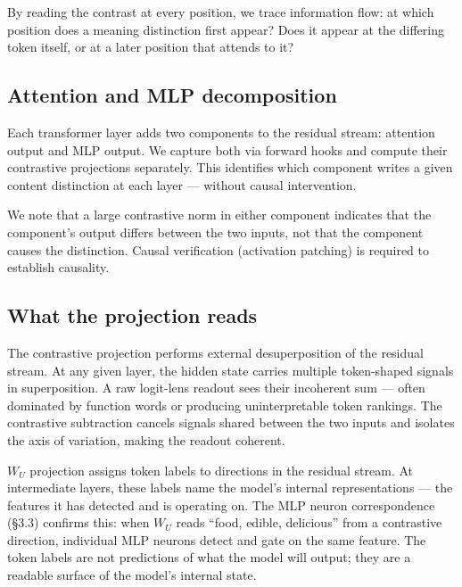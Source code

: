 \documentclass[11pt]{article}
\newcommand{\WU}{W_U}
\begin{document}
By reading the contrast at every position, we trace information flow: at
which position does a meaning distinction first appear? Does it appear at
the differing token itself, or at a later position that attends to it?

\subsection{Attention and MLP decomposition}

Each transformer layer adds two components to the residual stream: attention
output and MLP output. We capture both via forward hooks and compute their
contrastive projections separately. This identifies which component writes a
given content distinction at each layer --- without causal intervention.

We note that a large contrastive norm in either component indicates that the
component's output differs between the two inputs, not that the component causes
the distinction. Causal verification (activation patching) is required to
establish causality.

\subsection{What the projection reads}

The contrastive projection performs external desuperposition of the residual
stream. At any given layer, the hidden state carries multiple token-shaped
signals in superposition. A raw logit-lens readout sees their incoherent
sum --- often dominated by function words or producing uninterpretable token
rankings. The contrastive subtraction cancels signals shared between the two
inputs and isolates the axis of variation, making the readout coherent.

$\WU$ projection assigns token labels to directions in the residual stream.
At intermediate layers, these labels name the model's internal
representations --- the features it has detected and is operating on. The
MLP neuron correspondence (\S3.3) confirms this: when $\WU$ reads ``food,
edible, delicious'' from a contrastive direction, individual MLP neurons
detect and gate on the same feature. The token labels are not predictions
of what the model will output; they are a readable surface of the model's
internal state.
\end{document}
